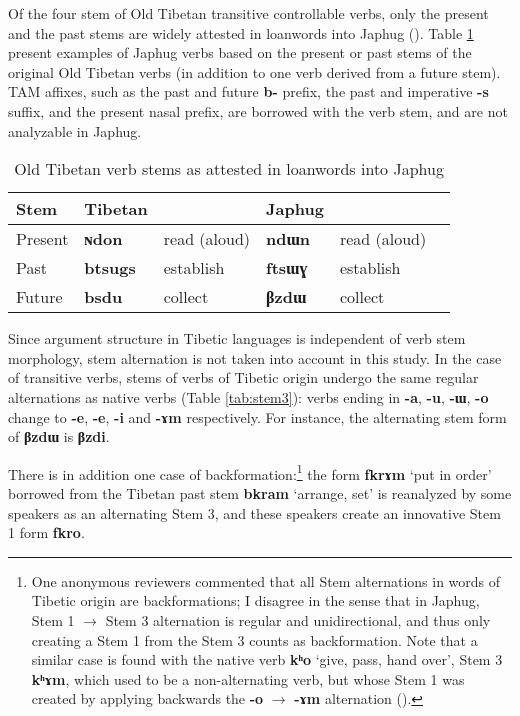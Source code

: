 \documentclass[oneside,a4paper,11pt]{article}
\newcommand{\ipa}[1]{{\phon\textbf{\mbox{#1}}}} %
\begin{document}
Of the four stem of Old Tibetan transitive controllable verbs, only the present and the past stems are widely attested in loanwords into Japhug (\citealt[138]{jacques04these}). Table  \ref{tab:four.stems} present examples of Japhug verbs based on the present or past stems of the original Old Tibetan verbs (in addition to one verb derived from a future stem). TAM affixes, such as the past and future \ipa{b-} prefix, the past and imperative \ipa{-s} suffix, and the present nasal prefix, are borrowed with the verb stem, and are not analyzable in Japhug.

\begin{table}[H]
\caption{Old Tibetan verb stems as attested in loanwords into Japhug} \label{tab:four.stems} \centering
\begin{tabular}{llllll}
\toprule
Stem&Tibetan && Japhug &\\
\midrule
Present & \ipa{ɴdon} & read (aloud) & \ipa{ndɯn} & read (aloud)&\\
Past  & \ipa{btsugs} & establish & \ipa{ftsɯɣ} &establish&\\
Future & \ipa{bsdu} & collect & \ipa{βzdɯ} & collect\\
\bottomrule
\end{tabular}
\end{table}

Since argument structure in Tibetic languages is independent of verb stem morphology, stem alternation is not taken into account in this study. In the case of transitive verbs, stems of verbs of Tibetic origin undergo the same regular alternations  as native verbs (Table \ref{tab:stem3}): verbs ending in \ipa{-a}, \ipa{-u}, \ipa{-ɯ}, \ipa{-o} change to \ipa{-e}, \ipa{-e}, \ipa{-i} and \ipa{-ɤm} respectively. For instance, the alternating stem form of \ipa{βzdɯ} is \ipa{βzdi}. 

There is in addition one case of backformation:\footnote{One anonymous reviewers commented that all Stem alternations in words of Tibetic origin are backformations; I disagree in the sense that in Japhug, Stem 1 $\rightarrow$ Stem 3 alternation is regular and unidirectional, and thus only creating a Stem 1 from the Stem 3 counts as backformation. Note that a similar case is found with the native verb \ipa{kʰo} `give, pass, hand over', Stem 3 \ipa{kʰɤm}, which used to be a non-alternating verb, but whose Stem 1 was created by applying backwards the \ipa{-o} $\rightarrow$ \ipa{-ɤm} alternation (\citealt{jacques14esquisse}).} the form \ipa{fkrɤm} `put in order' borrowed from the Tibetan past stem \ipa{bkram} `arrange, set' is reanalyzed by some speakers as an alternating Stem 3, and these speakers create an innovative Stem 1 form \ipa{fkro}. 
\end{document}
